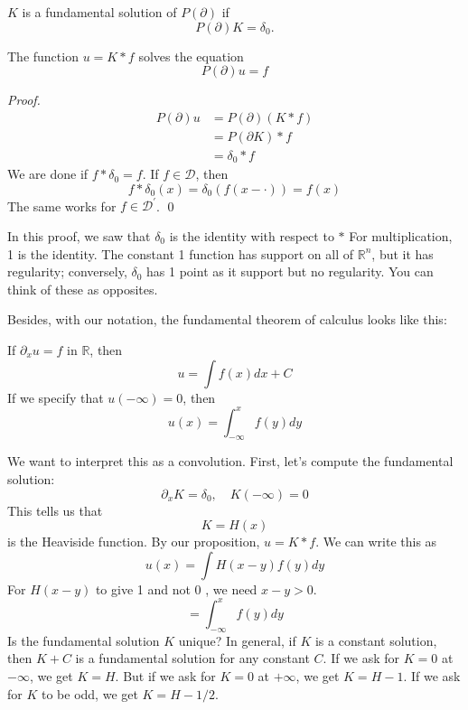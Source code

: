 \begin{definition}
     $K$ is a fundamental solution of $P(\partial)$ if
$$
P(\partial) K=\delta_{0}.
$$
\end{definition}

\begin{proposition}
    The function $u=K * f$ solves the equation
$$
P(\partial) u=f
$$
\end{proposition}
\begin{proof}
    $$
\begin{aligned}
P(\partial) u &=P(\partial)(K * f) \\
&=P(\partial K) * f \\
&=\delta_{0} * f
\end{aligned}
$$
We are done if $f * \delta_{0}=f .$ If $f \in \mathcal{D}$, then
$$
f * \delta_{0}(x)=\delta_{0}(f(x-\cdot))=f(x)
$$
The same works for $f \in \mathcal{D}^{\prime}$.
\qed
\end{proof}

In this proof, we saw that $\delta_{0}$ is the identity with respect to $*$ For multiplication, 1 is the identity. The constant 1 function has support on all of $\mathbb{R}^{n}$, but it has regularity; conversely, $\delta_{0}$ has 1 point as it support but no regularity. You can think of these as opposites.

Besides, with our notation, the fundamental theorem of calculus looks like this: 
\begin{theorem}
    If $\partial_{x} u=f$ in $\mathbb{R}$, then
$$
u=\int f(x) d x+C
$$
If we specify that $u(-\infty)=0$, then
$$
u(x)=\int_{-\infty}^{x} f(y) d y
$$
\end{theorem}

We want to interpret this as a convolution. First, let's compute the fundamental solution:
$$
\partial_{x} K=\delta_{0}, \quad K(-\infty)=0
$$
This tells us that
$$
K=H(x)
$$
is the Heaviside function. By our proposition, $u=K * f$. We can write this as
$$
u(x)=\int H(x-y) f(y) d y
$$
For $H(x-y)$ to give 1 and not 0 , we need $x-y>0$.
$$
=\int_{-\infty}^{x} f(y) d y
$$
Is the fundamental solution $K$ unique? In general, if $K$ is a constant solution, then $K+C$ is a fundamental solution for any constant $C$. If we ask for $K=0$ at $-\infty$, we get $K=H$. But if we ask for $K=0$ at $+\infty$, we get $K=H-1$. If we ask for $K$ to be odd, we get $K=H-1 / 2$.
